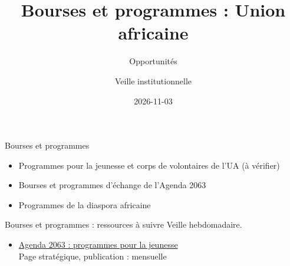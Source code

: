 \documentclass[aspectratio=169,11pt]{beamer}
\title{Bourses et programmes : Union africaine}
\subtitle{Opportunités}
\author{Veille institutionnelle}
\date{2026-11-03}
\begin{document}
\begin{frame}\titlepage\end{frame}

\begin{frame}{Bourses et programmes}
\begin{itemize}
\item Programmes pour la jeunesse et corps de volontaires de l'UA (à vérifier)
\item Bourses et programmes d'échange de l'Agenda 2063
\item Programmes de la diaspora africaine
\end{itemize}
\end{frame}

\begin{frame}{Bourses et programmes : ressources à suivre}
\small
Veille hebdomadaire.
\begin{itemize}
\item \href{https://au.int/en/agenda2063/overview}{Agenda 2063 : programmes pour la jeunesse}\\{\footnotesize Page stratégique, publication : mensuelle}
\end{itemize}
\end{frame}
\end{document}
